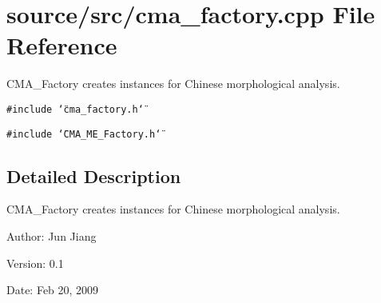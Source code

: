 \section{source/src/cma\_\-factory.cpp File Reference}
\label{cma__factory_8cpp}
CMA\_\-Factory creates instances for Chinese morphological analysis.  


{\tt \#include \char`\"{}cma\_\-factory.h\char`\"{}}\par
{\tt \#include \char`\"{}CMA\_\-ME\_\-Factory.h\char`\"{}}\par


\subsection{Detailed Description}
CMA\_\-Factory creates instances for Chinese morphological analysis. 

\begin{Desc}
\item[Author:]Jun Jiang \end{Desc}
\begin{Desc}
\item[Version:]0.1 \end{Desc}
\begin{Desc}
\item[Date:]Feb 20, 2009 \end{Desc}

